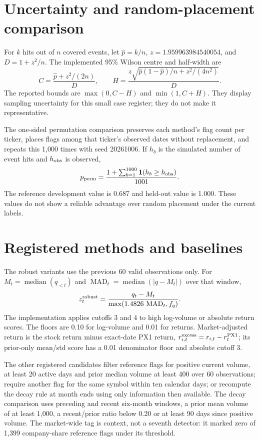 \section{Uncertainty and random-placement comparison}
For $k$ hits out of $n$ covered events, let $\hat p=k/n$,
$z=1.959963984540054$, and $D=1+z^2/n$. The implemented 95\% Wilson
centre and half-width are
\[
 C=\frac{\hat p+z^2/(2n)}{D},\qquad
 H=\frac{z\sqrt{\hat p(1-\hat p)/n+z^2/(4n^2)}}{D}.
\]
The reported bounds are $\max(0,C-H)$ and $\min(1,C+H)$. They display
sampling uncertainty for this small case register; they do not make it
representative.

The one-sided permutation comparison preserves each method's flag count
per ticker, places flags among that ticker's observed dates without
replacement, and repeats this 1,000 times with seed 20261006. If $h_b$
is the simulated number of event hits and $h_{\rm obs}$ is observed,
\[
 p_{\rm perm}=\frac{1+\sum_{b=1}^{1000}{\bf1}(h_b\geq h_{\rm obs})}{1001}.
\]
The reference development value is 0.687 and held-out value is 1.000.
These values do not show a reliable advantage over random placement
under the current labels.

\section{Registered methods and baselines}
The robust variants use the previous 60 valid observations only. For
$M_t=\operatorname{median}(q_{<t})$ and
$\operatorname{MAD}_t=\operatorname{median}(|q-M_t|)$ over that window,
\[
 z^{\rm robust}_t=\frac{q_t-M_t}{\max(1.4826\,\operatorname{MAD}_t,f_q)}.
\]
The implementation applies cutoffs 3 and 4 to high log-volume or
absolute return scores. The floors are 0.10 for log-volume and 0.01
for returns. Market-adjusted return is the stock return minus exact-date
PX1 return, $r^{\rm excess}_{i,t}=r_{i,t}-r^{\rm PX1}_t$; its
prior-only mean/std score has a 0.01 denominator floor and absolute
cutoff 3.

The other registered candidates filter reference flags for positive
current volume, at least 20 active days and prior median volume at
least 400 over 60 observations; require another flag for the same symbol
within ten calendar days; or recompute the decay rule at month ends using
only information then available. The decay comparison uses preceding and
recent six-month windows, a prior mean volume of at least 1,000, a
recent/prior ratio below 0.20 or at least 90 days since positive volume.
The market-wide tag is context, not a seventh detector: it marked zero
of 1,399 company-share reference flags under its threshold.

